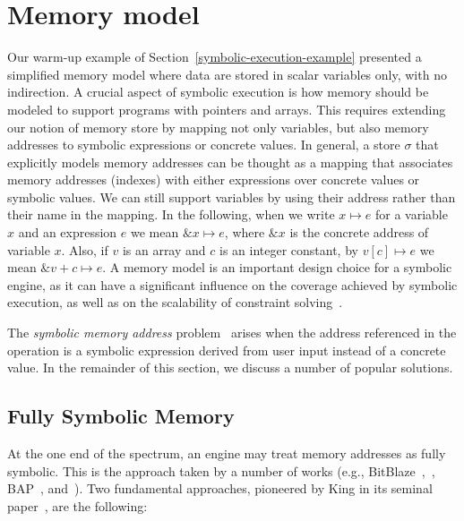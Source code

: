 

\section{Memory model}
\label{memory-model}

Our warm-up example of Section~\ref{symbolic-execution-example} presented a simplified memory model where data are stored in scalar variables only, with no indirection. A crucial aspect of symbolic execution is how memory should be modeled to support programs with pointers and arrays. This requires extending our notion of memory store by mapping not only variables, but also memory addresses to symbolic expressions or concrete values. In general, a store $\sigma$ that explicitly models memory addresses can be thought as a mapping that associates memory addresses (indexes) with either expressions over concrete values or symbolic values. We can still support variables by using their address rather than their name in the mapping. In the following, when we write $x\mapsto e$ for a variable $x$ and an expression $e$ we mean $\&x\mapsto e$, where $\&x$ is the concrete address of variable $x$. Also, if $v$ is an array and $c$ is an integer constant, by $v[c]\mapsto e$ we mean $\&v+c\mapsto e$. A memory model is an important design choice for a symbolic engine, as it can have a significant influence on the coverage achieved by symbolic execution, as well as on the scalability of constraint solving~\cite{CS-CACM13}.

The {\em symbolic memory address} problem~\cite{SAB-SP10} arises when the address referenced in the operation is a symbolic expression derived from user input instead of a concrete value. In the remainder of this section, we discuss a number of popular solutions.

\subsection{Fully Symbolic Memory}
\label{ss:fully-symbolic-memory}

At the one end of the spectrum, an engine may treat memory addresses as fully symbolic. This is the approach taken by a number of works (e.g., {\sc BitBlaze}~\cite{BITBLAZE-ICISS08},~\cite{TLL-CAV10}, {\sc BAP}~\cite{BAP-CAV11}, and~\cite{TS-ATVA14}). Two fundamental approaches, pioneered by King in its seminal paper~\cite{K-CACM76}, are the following:

